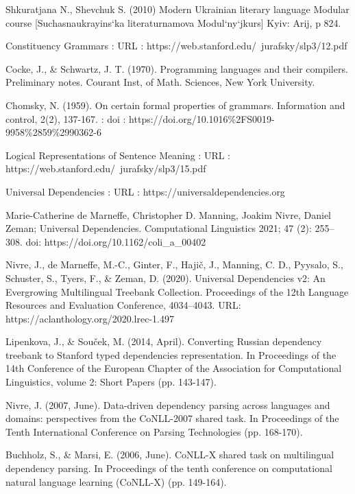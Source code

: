 \begin{thebibliography}{99}
\pagestyle{empty}

{}

Shkuratjana N., Shevchuk S. (2010) Modern Ukrainian literary language Modular
course [Suchasnaukrayins`ka
literaturnamova Modul`ny`jkurs] Kyiv: Arij, p 824.

Constituency Grammars : URL :
https://web.stanford.edu/~jurafsky/slp3/12.pdf

Cocke, J., \& Schwartz, J. T. (1970). Programming languages and their compilers.
Preliminary notes. Courant Inst, of Math. Sciences, New York University.

Chomsky, N. (1959). On certain formal properties of grammars. Information and
control, 2(2), 137-167. : doi :
https://doi.org/10.1016\%2FS0019-9958\%2859\%2990362-6

Logical Representations of Sentence Meaning : URL :
https://web.stanford.edu/~jurafsky/slp3/15.pdf

Universal Dependencies : URL : https://universaldependencies.org

Marie-Catherine de Marneffe, Christopher D. Manning, Joakim Nivre, Daniel Zeman;
Universal Dependencies. Computational Linguistics 2021; 47 (2): 255–308. doi:
https://doi.org/10.1162/coli\_a\_00402

Nivre, J., de Marneffe, M.-C., Ginter, F., Hajič, J., Manning, C. D., Pyysalo, S.,
Schuster, S., Tyers, F., \& Zeman, D. (2020). Universal Dependencies v2: An
Evergrowing Multilingual Treebank Collection. Proceedings of the 12th Language
Resources and Evaluation Conference, 4034–4043. URL:
https://aclanthology.org/2020.lrec-1.497

Lipenkova, J., \& Souček, M. (2014, April). Converting Russian dependency treebank
to Stanford typed dependencies representation. In Proceedings of the 14th
Conference of the European Chapter of the Association for Computational
Linguistics, volume 2: Short Papers (pp. 143-147).

Nivre, J. (2007, June). Data-driven dependency parsing across languages and
domains: perspectives from the CoNLL-2007 shared task. In Proceedings of the Tenth
International Conference on Parsing Technologies (pp. 168-170).

Buchholz, S., \& Marsi, E. (2006, June). CoNLL-X shared task on multilingual
dependency parsing. In Proceedings of the tenth conference on computational
natural language learning (CoNLL-X) (pp. 149-164).


\end{thebibliography}

